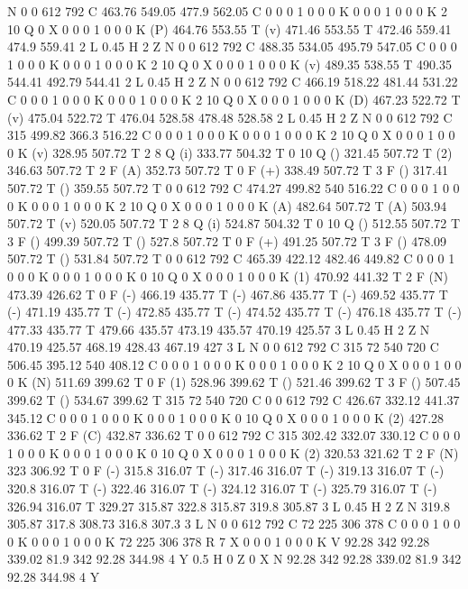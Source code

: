 N
0 0 612 792 C
463.76 549.05 477.9 562.05 C
0 0 0 1 0 0 0 K
0 0 0 1 0 0 0 K
2 10 Q
0 X
0 0 0 1 0 0 0 K
(P) 464.76 553.55 T
(v) 471.46 553.55 T
472.46 559.41 474.9 559.41 2 L
0.45 H
2 Z
N
0 0 612 792 C
488.35 534.05 495.79 547.05 C
0 0 0 1 0 0 0 K
0 0 0 1 0 0 0 K
2 10 Q
0 X
0 0 0 1 0 0 0 K
(v) 489.35 538.55 T
490.35 544.41 492.79 544.41 2 L
0.45 H
2 Z
N
0 0 612 792 C
466.19 518.22 481.44 531.22 C
0 0 0 1 0 0 0 K
0 0 0 1 0 0 0 K
2 10 Q
0 X
0 0 0 1 0 0 0 K
(D) 467.23 522.72 T
(v) 475.04 522.72 T
476.04 528.58 478.48 528.58 2 L
0.45 H
2 Z
N
0 0 612 792 C
315 499.82 366.3 516.22 C
0 0 0 1 0 0 0 K
0 0 0 1 0 0 0 K
2 10 Q
0 X
0 0 0 1 0 0 0 K
(v) 328.95 507.72 T
2 8 Q
(i) 333.77 504.32 T
0 10 Q
() 321.45 507.72 T
(2) 346.63 507.72 T
2 F
(A) 352.73 507.72 T
0 F
(+) 338.49 507.72 T
3 F
() 317.41 507.72 T
() 359.55 507.72 T
0 0 612 792 C
474.27 499.82 540 516.22 C
0 0 0 1 0 0 0 K
0 0 0 1 0 0 0 K
2 10 Q
0 X
0 0 0 1 0 0 0 K
(A) 482.64 507.72 T
(A) 503.94 507.72 T
(v) 520.05 507.72 T
2 8 Q
(i) 524.87 504.32 T
0 10 Q
() 512.55 507.72 T
3 F
() 499.39 507.72 T
() 527.8 507.72 T
0 F
(+) 491.25 507.72 T
3 F
() 478.09 507.72 T
() 531.84 507.72 T
0 0 612 792 C
465.39 422.12 482.46 449.82 C
0 0 0 1 0 0 0 K
0 0 0 1 0 0 0 K
0 10 Q
0 X
0 0 0 1 0 0 0 K
(1) 470.92 441.32 T
2 F
(N) 473.39 426.62 T
0 F
(-) 466.19 435.77 T
(-) 467.86 435.77 T
(-) 469.52 435.77 T
(-) 471.19 435.77 T
(-) 472.85 435.77 T
(-) 474.52 435.77 T
(-) 476.18 435.77 T
(-) 477.33 435.77 T
479.66 435.57 473.19 435.57 470.19 425.57 3 L
0.45 H
2 Z
N
470.19 425.57 468.19 428.43 467.19 427 3 L
N
0 0 612 792 C
315 72 540 720 C
506.45 395.12 540 408.12 C
0 0 0 1 0 0 0 K
0 0 0 1 0 0 0 K
2 10 Q
0 X
0 0 0 1 0 0 0 K
(N) 511.69 399.62 T
0 F
(1) 528.96 399.62 T
() 521.46 399.62 T
3 F
() 507.45 399.62 T
() 534.67 399.62 T
315 72 540 720 C
0 0 612 792 C
426.67 332.12 441.37 345.12 C
0 0 0 1 0 0 0 K
0 0 0 1 0 0 0 K
0 10 Q
0 X
0 0 0 1 0 0 0 K
(2) 427.28 336.62 T
2 F
(C) 432.87 336.62 T
0 0 612 792 C
315 302.42 332.07 330.12 C
0 0 0 1 0 0 0 K
0 0 0 1 0 0 0 K
0 10 Q
0 X
0 0 0 1 0 0 0 K
(2) 320.53 321.62 T
2 F
(N) 323 306.92 T
0 F
(-) 315.8 316.07 T
(-) 317.46 316.07 T
(-) 319.13 316.07 T
(-) 320.8 316.07 T
(-) 322.46 316.07 T
(-) 324.12 316.07 T
(-) 325.79 316.07 T
(-) 326.94 316.07 T
329.27 315.87 322.8 315.87 319.8 305.87 3 L
0.45 H
2 Z
N
319.8 305.87 317.8 308.73 316.8 307.3 3 L
N
0 0 612 792 C
72 225 306 378 C
0 0 0 1 0 0 0 K
0 0 0 1 0 0 0 K
72 225 306 378 R
7 X
0 0 0 1 0 0 0 K
V
92.28 342 92.28 339.02 81.9 342 92.28 344.98 4 Y
0.5 H
0 Z
0 X
N
92.28 342 92.28 339.02 81.9 342 92.28 344.98 4 Y
